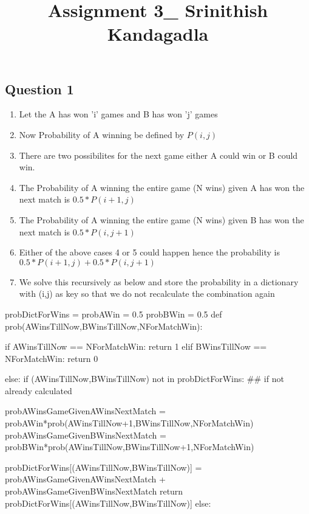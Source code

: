 \documentclass[11pt]{article}
\title{Assignment 3\_ Srinithish Kandagadla}
\providecommand{\tightlist}{%
      \setlength{\itemsep}{0pt}\setlength{\parskip}{0pt}}
\begin{document}
    
    
    \maketitle
    
    

    
    \subsection{Question 1}\label{question-1}

    \begin{enumerate}
\def\labelenumi{\arabic{enumi}.}
\tightlist
\item
  Let the A has won 'i' games and B has won 'j' games
\item
  Now Probability of A winning be defined by \(P(i,j)\)
\item
  There are two possibilites for the next game either A could win or B
  could win.
\item
  The Probability of A winning the entire game (N wins) given A has won
  the next match is \(0.5 * P(i+1,j)\)
\item
  The Probability of A winning the entire game (N wins) given B has won
  the next match is \(0.5 * P(i,j+1)\)
\item
  Either of the above cases 4 or 5 could happen hence the probability is
  \(0.5 * P(i+1,j) + 0.5 * P(i,j+1)\)
\item
  We solve this recursively as below and store the probability in a
  dictionary with (i,j) as key so that we do not recalculate the
  combination again
\end{enumerate}
probDictForWins = {}
probAWin = 0.5
probBWin = 0.5
def prob(AWinsTillNow,BWinsTillNow,NForMatchWin):

    if AWinsTillNow == NForMatchWin:
        return 1
    elif BWinsTillNow == NForMatchWin:
        return 0
    
    else:
        if (AWinsTillNow,BWinsTillNow) not in probDictForWins: ## if not already calculated
        
            probAWinsGameGivenAWinsNextMatch = probAWin*prob(AWinsTillNow+1,BWinsTillNow,NForMatchWin)
            probAWinsGameGivenBWinsNextMatch = probBWin*prob(AWinsTillNow,BWinsTillNow+1,NForMatchWin)
        
            probDictForWins[(AWinsTillNow,BWinsTillNow)] = probAWinsGameGivenAWinsNextMatch + probAWinsGameGivenBWinsNextMatch
            return probDictForWins[(AWinsTillNow,BWinsTillNow)]
        else:
            
\end{document}
